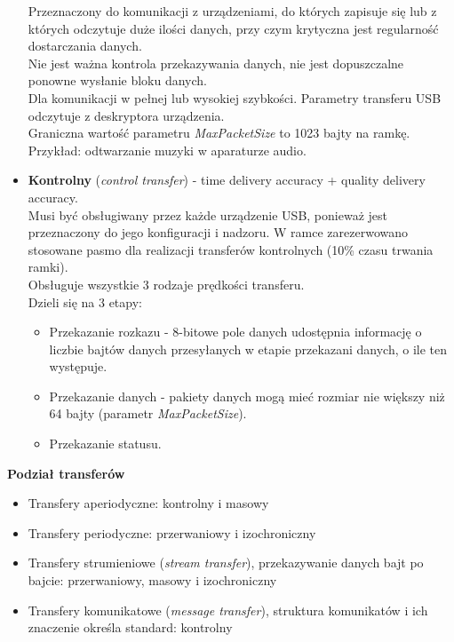\begin{itemize}
			Przeznaczony do komunikacji z urządzeniami, do których zapisuje się lub z których odczytuje duże ilości danych, przy czym krytyczna jest regularność dostarczania danych.\\
			Nie jest ważna kontrola przekazywania danych, nie jest dopuszczalne ponowne wysłanie bloku danych.\\
			Dla komunikacji w pełnej lub wysokiej szybkości. Parametry transferu USB odczytuje z deskryptora urządzenia.\\
			Graniczna wartość parametru \emph{MaxPacketSize} to 1023 bajty na ramkę.\\
			Przykład: odtwarzanie muzyki w aparaturze audio.
			\item \textbf{Kontrolny} (\emph{control transfer}) - time delivery accuracy + quality delivery accuracy.\\
			Musi być obsługiwany przez każde urządzenie USB, ponieważ jest przeznaczony do jego konfiguracji i nadzoru. W ramce zarezerwowano stosowane pasmo dla realizacji transferów kontrolnych (10\% czasu trwania ramki).\\
			Obsługuje wszystkie 3 rodzaje prędkości transferu.\\
			Dzieli się na 3 etapy:
			\begin{itemize}
				\item Przekazanie rozkazu - 8-bitowe pole danych udostępnia informację o liczbie bajtów danych przesyłanych w etapie przekazani danych, o ile ten występuje.
				\item Przekazanie danych - pakiety danych mogą mieć rozmiar nie większy niż 64 bajty (parametr \emph{MaxPacketSize}).
				\item Przekazanie statusu.
			\end{itemize}
		\end{itemize}
		\textbf{Podział transferów}
		\begin{itemize}
			\item Transfery aperiodyczne: kontrolny i masowy
			\item Transfery periodyczne: przerwaniowy i izochroniczny
			\item Transfery strumieniowe (\emph{stream transfer}), przekazywanie danych bajt po bajcie: przerwaniowy, masowy i izochroniczny
			\item Transfery komunikatowe (\emph{message transfer}), struktura komunikatów i ich znaczenie określa standard: kontrolny
		\end{itemize}
